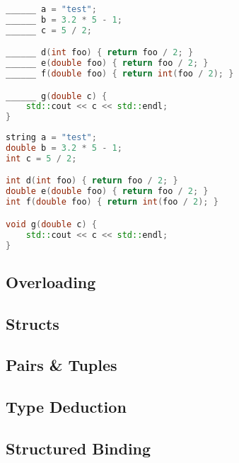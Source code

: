 \documentclass[]{article}
\begin{document}
\begin{minipage}{\linewidth}
    \begin{exercise}
    \begin{lstlisting}[language=C++, numbers=none]
______ a = "test";
______ b = 3.2 * 5 - 1;
______ c = 5 / 2;

______ d(int foo) { return foo / 2; }
______ e(double foo) { return foo / 2; }
______ f(double foo) { return int(foo / 2); }

______ g(double c) { 
    std::cout << c << std::endl;    
}
\end{lstlisting}
\end{exercise}
\end{minipage}

\begin{minipage}{\linewidth}
    \begin{solution}
        \begin{lstlisting}[language=C++, numbers=none]
string a = "test";
double b = 3.2 * 5 - 1;
int c = 5 / 2;

int d(int foo) { return foo / 2; }
double e(double foo) { return foo / 2; }
int f(double foo) { return int(foo / 2); }

void g(double c) { 
    std::cout << c << std::endl;    
}
\end{lstlisting}
    \end{solution}
\end{minipage}

\subsection{Overloading}
\subsection{Structs}
\subsection{Pairs \& Tuples}
\subsection{Type Deduction}
\subsection{Structured Binding}
\end{document}
